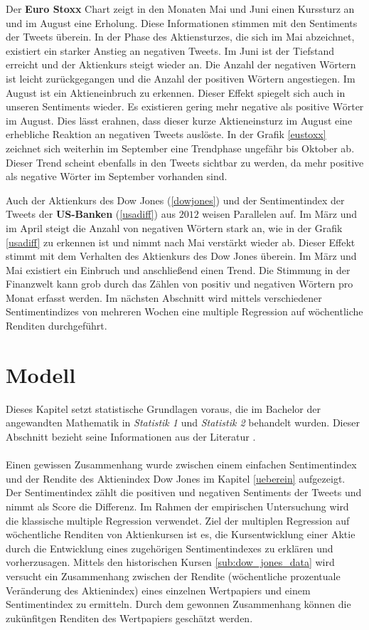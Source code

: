 Der \textbf{Euro Stoxx} Chart zeigt in den Monaten Mai und Juni einen Kurssturz an und im August eine Erholung. Diese Informationen stimmen mit den Sentiments der Tweets überein. In der Phase des Aktiensturzes, die sich im Mai abzeichnet, existiert ein starker Anstieg an negativen Tweets. Im Juni ist der Tiefstand erreicht und der Aktienkurs steigt wieder an. Die Anzahl der negativen Wörtern ist leicht zurückgegangen und die Anzahl der positiven Wörtern angestiegen. Im August ist ein Aktieneinbruch zu erkennen. Dieser Effekt spiegelt sich auch in unseren Sentiments wieder. Es existieren gering mehr negative als positive Wörter im August. Dies lässt erahnen, dass dieser kurze Aktieneinsturz im August eine erhebliche Reaktion an negativen Tweets auslöste. In der Grafik \ref{eustoxx} zeichnet sich weiterhin im September eine Trendphase ungefähr bis Oktober ab. Dieser Trend scheint ebenfalls in den Tweets sichtbar zu werden, da mehr positive als negative Wörter im September vorhanden sind. 

Auch der Aktienkurs des Dow Jones (\ref{dowjones}) und der Sentimentindex der Tweets der \textbf{US-Banken} (\ref{usadiff}) aus $2012$ weisen Parallelen auf. Im März und im April steigt die Anzahl von negativen Wörtern stark an, wie in der Grafik \ref{usadiff} zu erkennen ist und nimmt nach Mai verstärkt wieder ab. Dieser Effekt stimmt mit dem Verhalten des Aktienkurs des Dow Jones überein. Im März und Mai existiert ein Einbruch und anschließend einen Trend. Die Stimmung in der Finanzwelt kann grob durch das Zählen von positiv und negativen Wörtern pro Monat erfasst werden. Im nächsten Abschnitt wird mittels verschiedener Sentimentindizes von mehreren Wochen eine multiple Regression auf wöchentliche Renditen durchgeführt.

\newpage

\section{Modell}\label{Modell}
Dieses Kapitel setzt statistische Grundlagen voraus, die im Bachelor der angewandten Mathematik in \textit{Statistik 1} und \textit{Statistik 2} behandelt wurden. Dieser Abschnitt bezieht seine Informationen aus der Literatur \cite{becker}. \\
\\
Einen gewissen Zusammenhang wurde zwischen einem einfachen Sentimentindex und der Rendite des Aktienindex Dow Jones im Kapitel \ref{ueberein} aufgezeigt. Der Sentimentindex zählt die positiven und negativen Sentiments der Tweets und nimmt als Score die Differenz. Im Rahmen der empirischen Untersuchung wird die klassische multiple Regression verwendet. Ziel der multiplen Regression auf wöchentliche Renditen von Aktienkursen ist es, die Kursentwicklung einer Aktie durch die Entwicklung eines zugehörigen Sentimentindexes zu erklären und vorherzusagen. Mittels den historischen Kursen \ref{sub:dow_jones_data} wird versucht ein Zusammenhang zwischen der Rendite (wöchentliche prozentuale Veränderung des Aktienindex) eines einzelnen Wertpapiers und einem Sentimentindex zu ermitteln. Durch dem gewonnen Zusammenhang können die zukünfitgen Renditen des Wertpapiers geschätzt werden.

